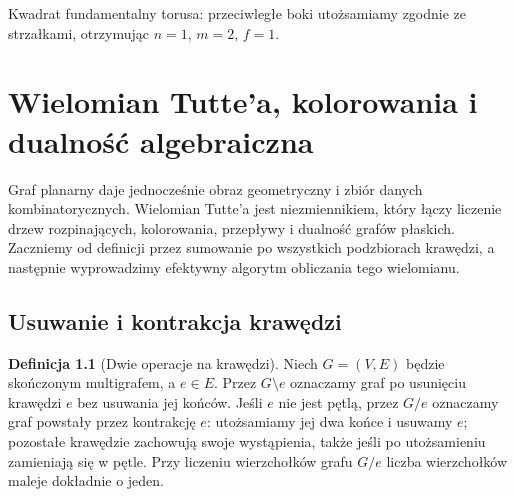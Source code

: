 \documentclass[11pt,a4paper]{report}
\numberwithin{equation}{section}
\theoremstyle{plain}
\theoremstyle{definition}
\newtheorem{definicja}[twierdzenie]{Definicja}
\theoremstyle{remark}
\begin{document}
\begin{center}

{\footnotesize Kwadrat fundamentalny torusa: przeciwległe boki
utożsamiamy zgodnie ze strzałkami, otrzymując $n=1$, $m=2$, $f=1$.}
\end{center}


\chapter{Wielomian Tutte'a, kolorowania i dualność algebraiczna}
\label{ch:tg-tutte}

Graf planarny daje jednocześnie obraz geometryczny i zbiór danych
kombinatorycznych. Wielomian Tutte'a jest niezmiennikiem, który
łączy liczenie drzew rozpinających, kolorowania, przepływy
i dualność grafów płaskich. Zaczniemy od definicji przez
sumowanie po wszystkich podzbiorach krawędzi, a następnie
wyprowadzimy efektywny algorytm obliczania tego wielomianu.

\section{Usuwanie i kontrakcja krawędzi}
\label{sec:tg-deletion-contraction}

\begin{definicja}[Dwie operacje na krawędzi]
Niech $G=(V,E)$ będzie skończonym multigrafem, a $e\in E$.
Przez $G\setminus e$ oznaczamy graf po usunięciu krawędzi $e$
bez usuwania jej końców. Jeśli $e$ nie jest pętlą,
przez $G/e$ oznaczamy graf powstały przez kontrakcję $e$:
utożsamiamy jej dwa końce i usuwamy $e$; pozostałe krawędzie
zachowują swoje wystąpienia, także jeśli po utożsamieniu
zamieniają się w pętle. Przy liczeniu wierzchołków grafu $G/e$
liczba wierzchołków maleje dokładnie o jeden.
\end{definicja}
\end{document}
